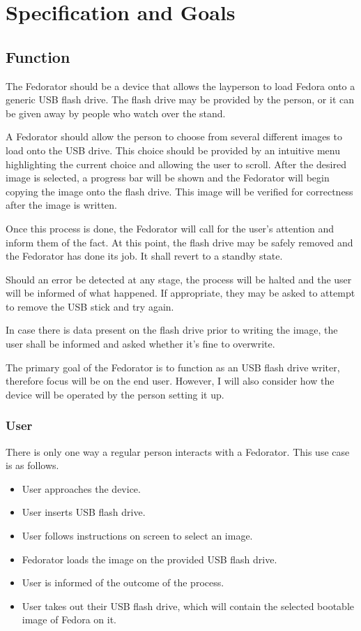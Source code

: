 \chapter{Specification and Goals}
    \section{Function}
        The Fedorator should be a device that allows the layperson to load Fedora onto a generic USB flash drive.  The flash drive may be provided by the person, or it can be given away by people who watch over the stand.
        
        A Fedorator should allow the person to choose from several different images to load onto the USB drive.  This choice should be provided by an intuitive menu highlighting the current choice and allowing the user to scroll.  After the desired image is selected, a progress bar will be shown and the Fedorator will begin copying the image onto the flash drive.  This image will be verified for correctness after the image is written.
        
        Once this process is done, the Fedorator will call for the user's attention and inform them of the fact.  At this point, the flash drive may be safely removed and the Fedorator has done its job.  It shall revert to a standby state.
        
        Should an error be detected at any stage, the process will be halted and the user will be informed of what happened.  If appropriate, they may be asked to attempt to remove the USB stick and try again.
        
        In case there is data present on the flash drive prior to writing the image, the user shall be informed and asked whether it's fine to overwrite.
        
        The primary goal of the Fedorator is to function as an USB flash drive writer, therefore focus will be on the end user.  However, I will also consider how the device will be operated by the person setting it up.
        \subsection{User}
            There is only one way a regular person interacts with a Fedorator.  This use case is as follows.
            
            \begin{itemize}
                \item User approaches the device.
                \item User inserts USB flash drive.
                \item User follows instructions on screen to select an image.
                \item Fedorator loads the image on the provided USB flash drive.
                \item User is informed of the outcome of the process.
                \item User takes out their USB flash drive, which will contain the selected bootable image of Fedora on it.
            \end{itemize}
